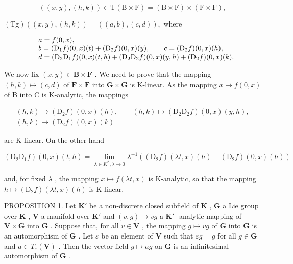 \[
((x, y), (h, k)) \in \mathrm{T} (\mathrm{B} \times \mathrm{F}) = (\mathrm{B} \times \mathrm{F}) \times (\mathrm{F} \times \mathrm{F}),
\]

\((\mathrm{Tg})((x,y),(h,k)) = ((a,b),(c,d)),\) where

\[
\begin{array}{r l} & {a = f (0, x),} \\ & {b = (\mathrm{D} _ {1} f) (0, x) (t) + (\mathrm{D} _ {2} f) (0, x) (y), \qquad c = (\mathrm{D} _ {2} f) (0, x) (h),} \\ & {d = (\mathrm{D} _ {2} \mathrm{D} _ {1} f) (0, x) (t, h) + (\mathrm{D} _ {2} \mathrm{D} _ {2} f) (0, x) (y, h) + (\mathrm{D} _ {2} f) (0, x) (k).} \end{array}
\]

We now fix \((x,y)\in \mathbf{B}\times \mathbf{F}\) . We need to prove that the mapping \((h,k)\mapsto (c,d)\) of \(\mathbf{F}\times \mathbf{F}\) into \(\mathbf{G}\times \mathbf{G}\) is K-linear. As the mapping \(x\mapsto f(0,x)\) of B into C is K-analytic, the mappings

\[
\begin{array}{c} (h, k) \mapsto (\mathrm{D} _ {2} f) (0, x) (h), \qquad (h, k) \mapsto (\mathrm{D} _ {2} \mathrm{D} _ {2} f) (0, x) (y, h), \\ (h, k) \mapsto (\mathrm{D} _ {2} f) (0, x) (k) \end{array}
\]

are K-linear. On the other hand

\[
\left(\mathrm{D} _ {2} \mathrm{D} _ {1} f\right) (0, x) (t, h) = \lim _ {\lambda \in K ^ {*}, \lambda \rightarrow 0} \lambda^ {- 1} \left(\left(\mathrm{D} _ {2} f\right) (\lambda t, x) (h) - \left(\mathrm{D} _ {2} f\right) (0, x) (h)\right)
\]

and, for fixed \(\lambda\) , the mapping \(x \mapsto f(\lambda t, x)\) is K-analytic, so that the mapping \(h \mapsto (\mathrm{D}_2f)(\lambda t, x)(h)\) is K-linear.

PROPOSITION 1. Let \(\mathbf{K}'\) be a non-discrete closed subfield of \(\mathbf{K}\) , \(\mathbf{G}\) a Lie group over \(\mathbf{K}\) , \(\mathbf{V}\) a manifold over \(\mathbf{K}'\) and \((v, g) \mapsto vg\) a \(\mathbf{K}'\) -analytic mapping of \(\mathbf{V} \times \mathbf{G}\) into \(\mathbf{G}\) . Suppose that, for all \(v \in \mathbf{V}\) , the mapping \(g \mapsto vg\) of \(\mathbf{G}\) into \(\mathbf{G}\) is an automorphism of \(\mathbf{G}\) . Let \(\varepsilon\) be an element of \(\mathbf{V}\) such that \(\varepsilon g = g\) for all \(g \in \mathbf{G}\) and \(a \in T_{\varepsilon}(\mathbf{V})\) . Then the vector field \(g \mapsto ag\) on \(\mathbf{G}\) is an infinitesimal automorphism of \(\mathbf{G}\) .

